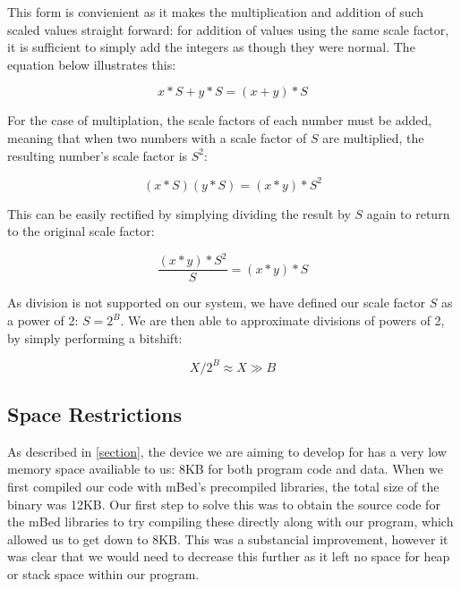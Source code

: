 This form is convienient as it makes the multiplication and addition of such scaled values straight forward: for addition of values using the same scale factor, it is sufficient to simply add the integers as though they were normal. The equation below illustrates this:

\begin{equation}
\label{eq:bits:addition}
x*S+y*S=(x+y)*S
\end{equation}

For the case of multiplation, the scale factors of each number must be added, meaning that when two numbers with a scale factor of $S$ are multiplied, the resulting number's scale factor is $S^2$:

\begin{equation}
\label{eq:bits:multiplication}
(x*S)(y*S)=(x*y)*S^2
\end{equation}

This can be easily rectified by simplying dividing the result by $S$ again to return to the original scale factor:

\begin{equation}
\label{eq:bits:rescale}
\frac{(x*y)*S^2}{S}=(x*y)*S
\end{equation}

As division is not supported on our system, we have defined our scale factor $S$ as a power of 2: $S=2^B$. We are then able to approximate divisions of powers of 2, by simply performing a bitshift:

\begin{equation}
\label{eq:bits:div_approx}
X/2^B\approx X \gg B
\end{equation}

\subsection{Space Restrictions}

As described in \ref{section}, the device we are aiming to develop for has a very low memory space availiable to us: 8KB for both program code and data. When we first compiled our code with mBed's precompiled libraries, the total size of the binary was 12KB. Our first step to solve this was to obtain the source code for the mBed libraries to try compiling these directly along with our program, which allowed us to get down to 8KB. This was a substancial improvement, however it was clear that we would need to decrease this further as it left no space for heap or stack space within our program.

